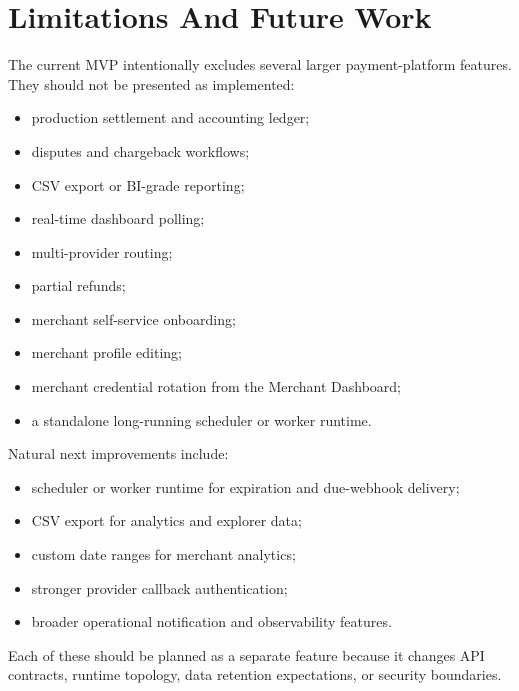 \chapter{Limitations And Future Work}

The current MVP intentionally excludes several larger payment-platform
features. They should not be presented as implemented:

\begin{itemize}
  \item production settlement and accounting ledger;
  \item disputes and chargeback workflows;
  \item CSV export or BI-grade reporting;
  \item real-time dashboard polling;
  \item multi-provider routing;
  \item partial refunds;
  \item merchant self-service onboarding;
  \item merchant profile editing;
  \item merchant credential rotation from the Merchant Dashboard;
  \item a standalone long-running scheduler or worker runtime.
\end{itemize}

Natural next improvements include:

\begin{itemize}
  \item scheduler or worker runtime for expiration and due-webhook delivery;
  \item CSV export for analytics and explorer data;
  \item custom date ranges for merchant analytics;
  \item stronger provider callback authentication;
  \item broader operational notification and observability features.
\end{itemize}

Each of these should be planned as a separate feature because it changes API
contracts, runtime topology, data retention expectations, or security
boundaries.
